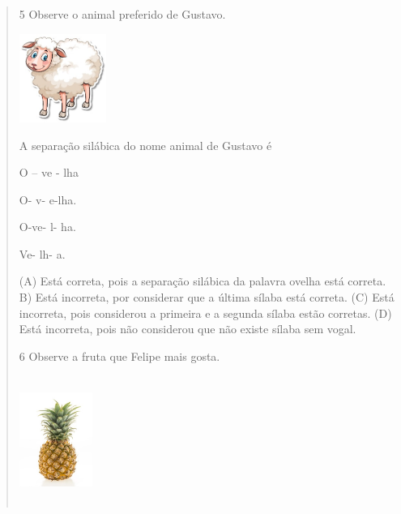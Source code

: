 \begin{verse}
\num{5} Observe o animal preferido de Gustavo.

\includegraphics[width=1.11458in,height=1.13889in]{media/image142.jpeg}


A separação silábica do nome animal de Gustavo é

\begin{minipage}{.5\textwidth}
\begin{escolha}
\item O -- ve - lha

\item O- v- e-lha.

\item O-ve- l- ha.

\item Ve- lh- a.
\end{escolha}
\end{minipage}

(A) Está correta, pois a separação silábica da palavra ovelha está correta.
B) Está incorreta, por considerar que a última sílaba está correta.
(C) Está incorreta, pois considerou a primeira e a segunda sílaba estão corretas.
(D) Está incorreta, pois não considerou que não existe sílaba sem vogal.

\num{6} Observe a fruta que Felipe mais gosta.

\includegraphics[width=0.94236in,height=1.64306in]{media/image143.jpeg}


\end{verse}
